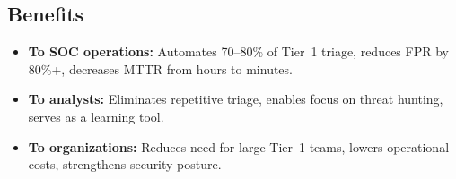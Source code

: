 \documentclass[12pt,a4paper]{report}
\begin{document}
\subsection{Benefits}
\begin{itemize}
    \item \textbf{To SOC operations:} Automates 70--80\% of Tier~1 triage, reduces FPR by 80\%+, decreases MTTR from hours to minutes.
    \item \textbf{To analysts:} Eliminates repetitive triage, enables focus on threat hunting, serves as a learning tool.
    \item \textbf{To organizations:} Reduces need for large Tier~1 teams, lowers operational costs, strengthens security posture.
\end{itemize}

\end{document}
